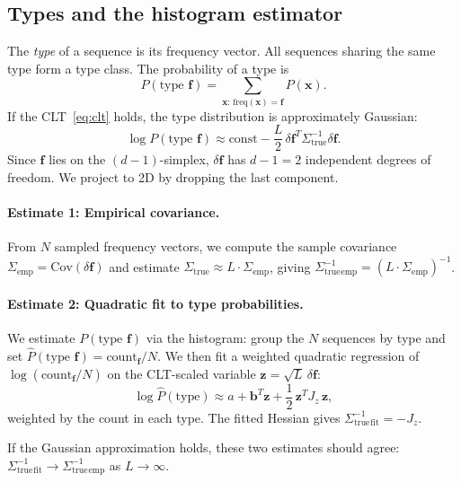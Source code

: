 \documentclass[11pt]{article}
\newcommand{\vf}{\mathbf{f}}
\newcommand{\vx}{\mathbf{x}}
\newcommand{\Strue}{\Sigma_{\mathrm{true}}}
\begin{document}
\subsection{Types and the histogram estimator}

The \emph{type} of a sequence is its frequency vector. All sequences sharing the same type form a type class. The probability of a type is
\begin{equation}
  P(\text{type } \vf) = \sum_{\vx:\,\mathrm{freq}(\vx) = \vf} P(\vx).
\end{equation}
If the CLT~\eqref{eq:clt} holds, the type distribution is approximately Gaussian:
\begin{equation}\label{eq:type-gaussian}
  \log P(\text{type } \vf) \approx \text{const} - \frac{L}{2}\,\delta\vf^T \Strue^{-1} \delta\vf.
\end{equation}
Since $\vf$ lies on the $(d{-}1)$-simplex, $\delta\vf$ has $d - 1 = 2$ independent degrees of freedom. We project to 2D by dropping the last component.

\paragraph{Estimate 1: Empirical covariance.} From $N$ sampled frequency vectors, we compute the sample covariance $\Sigma_{\mathrm{emp}} = \mathrm{Cov}(\delta\vf)$ and estimate $\Strue \approx L \cdot \Sigma_{\mathrm{emp}}$, giving $\Strue^{-1}_{\mathrm{emp}} = (L \cdot \Sigma_{\mathrm{emp}})^{-1}$.

\paragraph{Estimate 2: Quadratic fit to type probabilities.} We estimate $P(\text{type } \vf)$ via the histogram: group the $N$ sequences by type and set $\hat{P}(\text{type } \vf) = \text{count}_\vf / N$. We then fit a weighted quadratic regression of $\log(\text{count}_\vf / N)$ on the CLT-scaled variable $\mathbf{z} = \sqrt{L}\,\delta\vf$:
\begin{equation}
  \log \hat{P}(\text{type}) \approx a + \mathbf{b}^T \mathbf{z} + \frac{1}{2}\,\mathbf{z}^T J_z\, \mathbf{z},
\end{equation}
weighted by the count in each type. The fitted Hessian gives $\Strue^{-1}_{\mathrm{fit}} = -J_z$.

If the Gaussian approximation holds, these two estimates should agree: $\Strue^{-1}_{\mathrm{fit}} \to \Strue^{-1}_{\mathrm{emp}}$ as $L \to \infty$.
\end{document}
